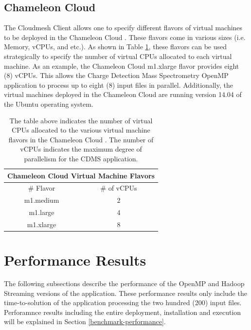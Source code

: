 \documentclass[9pt,twocolumn,twoside]{../../styles/osajnl}
\begin{document}
\subsection{Chameleon Cloud}
The Cloudmesh Client allows one to specify different flavors of
virtual machines to be deployed in the Chameleon Cloud
\cite{www-cloudmesh, www-chameleon}. These flavors come in various
sizes (i.e. Memory, vCPUs, and etc.). As shown in Table
\ref{tab:hadoop}, these flavors can be used strategically to specify
the number of virtual CPUs allocated to each virtual machine. As an
example, the Chameleon Cloud m1.xlarge flavor provides eight (8)
vCPUs. This allows the Charge Detection Mass Spectrometry OpenMP
application to process up to eight (8) input files in
parallel. Additionally, the virtual machines deployed in the Chameleon
Cloud are running version 14.04 of the Ubuntu operating system.
\begin{table}[htbp]
\centering
\begin{tabular}{cc}
\multicolumn{2}{c}{\bf Chameleon Cloud Virtual Machine
  Flavors}\\ \hline \# Flavor & \# of vCPUs \\ \hline m1.medium & 2
\\ m1.large & 4 \\ m1.xlarge & 8 \\ \hline
\end{tabular}
\caption{The table above indicates the number of virtual CPUs
  allocated to the various virtual machine flavors in the Chameleon
  Cloud \cite{www-chameleon}. The number of vCPUs indicates the
  maximum degree of parallelism for the CDMS application.}
\label{tab:hadoop}
\end{table}

\section{Performance Results} \label{performance}
The following subsections describe the performance of the OpenMP and
Hadoop Streaming versions of the application. These performance
results only include the time-to-solution of the application
processing the two hundred (200) input files. Perforamnce results
including the entire deployment, installation and execution will be
explained in Section \ref{benchmark-performance}.
\end{document}

